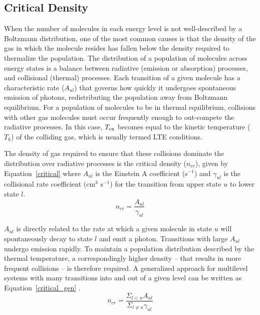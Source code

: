 \documentclass[twocolumn]{aastex631}
\begin{document}
\subsection{Critical Density}
\label{sec:radex}

When the number of molecules in each energy level is not well-described by a Boltzmann distribution, one of the most common causes is that the density of the gas in which the molecule resides has fallen below the density required to thermalize the population.  The distribution of a population of molecules across energy states is a balance between radiative (emission or absorption) processes, and collisional (thermal) processes.  Each transition of a given molecule has a characteristic rate ($A_{ul}$) that governs how quickly it undergoes spontaneous emission of photons, redistributing the population away from Boltzmann equilibrium.  For a population of molecules to be in thermal equilibrium, collisions with other gas molecules must occur frequently enough to out-compete the radiative processes.  In this case, $T_{\rm{ex}}$ becomes equal to the kinetic temperature ($T_{k}$) of the colliding gas, which is usually termed LTE conditions.

The density of gas required to ensure that these collisions dominate the distribution over radiative processes is the critical density ($n_{cr}$), given by Equation~\ref{critical} \citep{Tielens:2005ux} where $A_{ul}$ is the Einstein A coefficient (s$^{-1}$) and $\gamma_{ul}$ is the collisional rate coefficient (cm$^3$ s$^{-1}$) for the transition from upper state $u$ to lower state $l$.
\begin{equation}
n_{cr} = \frac{A_{ul}}{\gamma _{ul}}
\label{critical}
\end{equation}

$A_{ul}$ is directly related to the rate at which a given molecule in state $u$ will spontaneously decay to state $l$ and emit a photon.  Transitions with large $A_{ul}$ undergo emission rapidly.  To maintain a population distribution described by the thermal temperature, a correspondingly higher density -- that results in more frequent collisions -- is therefore required. A generalized approach for multilevel systems with many transitions into and out of a given level can be written as Equation~\ref{critical_gen} \citep{Tielens:2005ux}.
\begin{equation}
n_{cr} = \frac{\Sigma_{l<u}A_{ul}}{\Sigma_{l\neq u}\gamma _{ul}}
\label{critical_gen}    
\end{equation}
\end{document}
